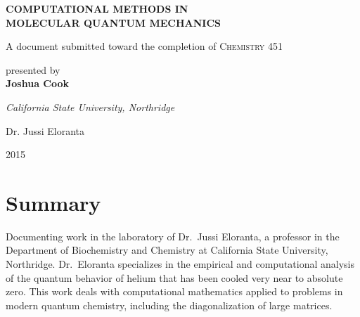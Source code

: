 \documentclass[12pt,]{book}
\date{}
\begin{document}
\newcommand{\vecu}{\mathbf{u}}
\newcommand{\ddx}{\frac{d}{dx}}

\frontmatter

\begin{titlepage}
    \begin{center}
           
       \large{ \textbf{ \uppercase{Computational Methods in \\ Molecular Quantum Mechanics}}}
        
        \vspace{0.5cm}
        
        \vspace{1.5cm}
 
        A document submitted toward the completion of
        \large{\textsc{Chemistry 451}}\\ 
        
        \vspace{0.8cm}        
         
        presented by\\        
        \textbf{Joshua Cook}
       
       \vspace{0.8cm}    
        \textit{California State University, Northridge}       
        
         \vspace{2cm}
         Dr. Jussi Eloranta             
       

        
        
        \vfill
  
        2015
        
 
 
     \end{center}
    \thispagestyle{empty}
\end{titlepage}

\newpage

\thispagestyle{empty} \mbox{}

\chapter{Summary}

Documenting work in the laboratory of Dr.~Jussi Eloranta, a professor in
the Department of Biochemistry and Chemistry at California State
University, Northridge. Dr.~Eloranta specializes in the empirical and
computational analysis of the quantum behavior of helium that has been
cooled very near to absolute zero. This work deals with computational
mathematics applied to problems in modern quantum chemistry, including
the diagonalization of large matrices.
\end{document}
